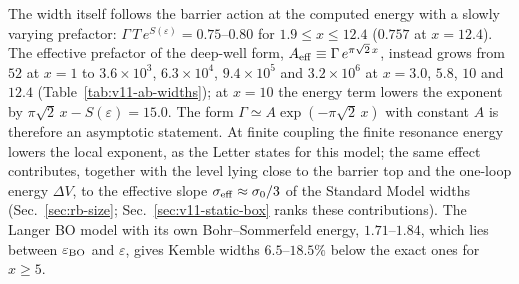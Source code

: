 The width itself follows the barrier action at the computed energy with a slowly varying prefactor: $\Gamma\,T\,e^{S(\varepsilon)}=0.75$--$0.80$ for $1.9\le x\le12.4$ ($0.757$ at $x=12.4$). %
The effective prefactor of the deep-well form, $A_{\rm eff}\equiv\Gamma\,e^{\pi\sqrt2\,x}$, instead grows from $52$ at $x=1$ to $3.6\times10^3$, $6.3\times10^4$, $9.4\times10^5$ and $3.2\times10^6$ at $x=3.0$, $5.8$, $10$ and $12.4$ (Table~\ref{tab:v11-ab-widths}); at $x=10$ the energy term lowers the exponent by $\pi\sqrt2\,x-S(\varepsilon)=15.0$. %
The form $\Gamma\simeq A\exp(-\pi\sqrt2\,x)$ with constant $A$ is therefore an asymptotic statement.
At finite coupling the finite resonance energy lowers the local exponent, as the Letter states for this model; the same effect contributes, together with the level lying close to the barrier top and the one-loop energy $\Delta V$, to the effective slope $\sigma_{\rm eff}\approx\sigma_0/3$ of the Standard Model widths (Sec.~\ref{sec:rb-size}; Sec.~\ref{sec:v11-static-box} ranks these contributions).
The Langer BO model with its own Bohr--Sommerfeld energy, $1.71$--$1.84$, which lies between $\varepsilon_{\rm BO}$ and $\varepsilon$, gives Kemble widths $6.5$--$18.5\%$ below the exact ones for $x\ge5$. %

